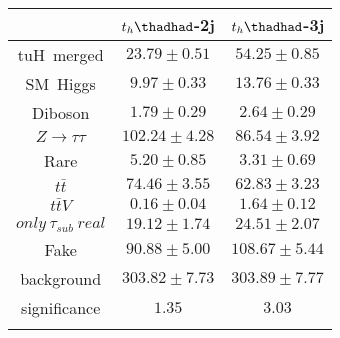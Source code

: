 \centering
\begin{tabular}{|ccc} \toprule\toprule
 & $t_{h}\thadhad$-2j & $t_{h}\thadhad$-3j\\\midrule
tuH~merged & $23.79\pm0.51$ & $54.25\pm0.85$\\
SM~Higgs & $9.97\pm0.33$ & $13.76\pm0.33$\\
Diboson & $1.79\pm0.29$ & $2.64\pm0.29$\\
$Z\to\tau\tau$ & $102.24\pm4.28$ & $86.54\pm3.92$\\
Rare & $5.20\pm0.85$ & $3.31\pm0.69$\\
$t\bar{t}$ & $74.46\pm3.55$ & $62.83\pm3.23$\\
$t\bar{t}V$ & $0.16\pm0.04$ & $1.64\pm0.12$\\
$only~\tau_{sub}~real$ & $19.12\pm1.74$ & $24.51\pm2.07$\\
Fake & $90.88\pm5.00$ & $108.67\pm5.44$\\
background & $303.82\pm7.73$ & $303.89\pm7.77$\\
significance & $1.35$ & $3.03$\\
\bottomrule\bottomrule\\
\end{tabular}

